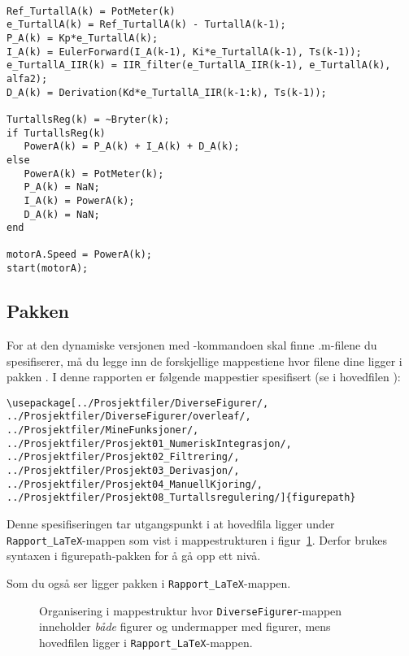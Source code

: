  \begin{lstlisting}[caption={Kode for turtallsregulator for 
   motor A.}, label=kode:turtall2, firstnumber=11]
% trykknapp bestemmer om regulator er i auto eller manuel

Ref_TurtallA(k) = PotMeter(k)
e_TurtallA(k) = Ref_TurtallA(k) - TurtallA(k-1);
P_A(k) = Kp*e_TurtallA(k);
I_A(k) = EulerForward(I_A(k-1), Ki*e_TurtallA(k-1), Ts(k-1));
e_TurtallA_IIR(k) = IIR_filter(e_TurtallA_IIR(k-1), e_TurtallA(k), alfa2);
D_A(k) = Derivation(Kd*e_TurtallA_IIR(k-1:k), Ts(k-1));

TurtallsReg(k) = ~Bryter(k);
if TurtallsReg(k)
   PowerA(k) = P_A(k) + I_A(k) + D_A(k);
else
   PowerA(k) = PotMeter(k);
   P_A(k) = NaN;
   I_A(k) = PowerA(k);
   D_A(k) = NaN;
end

motorA.Speed = PowerA(k);
start(motorA);   
\end{lstlisting}



\subsection{Pakken }
For at den dynamiske versjonen med -kommandoen
skal finne .m-filene du
spesifiserer, må du legge inn de forskjellige
mappestiene hvor filene dine ligger  i pakken . 
I denne rapporten er følgende mappestier spesifisert (se i hovedfilen
):

\begin{boxedminipage}{\textwidth}
\begin{verbatim}
\usepackage[../Prosjektfiler/DiverseFigurer/, 
../Prosjektfiler/DiverseFigurer/overleaf/,
../Prosjektfiler/MineFunksjoner/,
../Prosjektfiler/Prosjekt01_NumeriskIntegrasjon/,
../Prosjektfiler/Prosjekt02_Filtrering/,
../Prosjektfiler/Prosjekt03_Derivasjon/,
../Prosjektfiler/Prosjekt04_ManuellKjoring/,
../Prosjektfiler/Prosjekt08_Turtallsregulering/]{figurepath} 
\end{verbatim}
\end{boxedminipage}

Denne spesifiseringen tar utgangspunkt i at hovedfila  ligger
under {\tt Rapport\_LaTeX}-mappen som vist i mappestrukturen i figur~\ref{fig:mappestruktur}.
Derfor brukes syntaxen  i figurepath-pakken for å gå opp ett nivå.

Som du også ser ligger pakken  i {\tt Rapport\_LaTeX}-mappen.

\begin{figure}[H]
  \centering
  \caption{Organisering i mappestruktur hvor {\tt DiverseFigurer}-mappen
    inneholder {\em både} figurer og undermapper med figurer, mens 
    hovedfilen ligger i {\tt Rapport\_LaTeX}-mappen. } 
  \label{fig:mappestruktur}
\end{figure}




